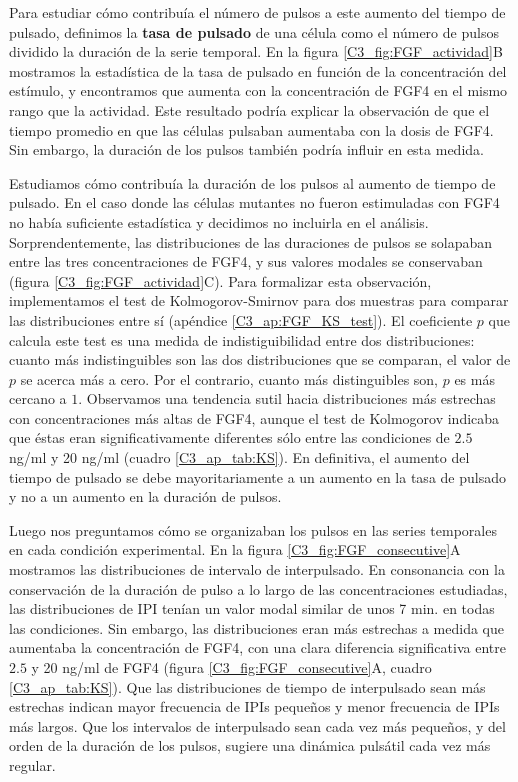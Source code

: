 \documentclass[./main.tex]{subfiles}
\begin{document}
Para estudiar cómo contribuía el número de pulsos a este aumento del tiempo de pulsado, definimos la \textbf{tasa de pulsado} de una célula como el número de pulsos dividido la duración de la serie temporal. En la figura  \ref{C3_fig:FGF_actividad}B mostramos la estadística de la tasa de pulsado en función de la concentración del estímulo, y encontramos que aumenta con la concentración de FGF4 en el mismo rango que la actividad. Este resultado podría explicar la observación de que el tiempo promedio en que las células pulsaban aumentaba con la dosis de FGF4. Sin embargo, la duración de los pulsos también podría influir en esta medida. 


Estudiamos cómo contribuía la duración de los pulsos al aumento de tiempo de pulsado. En el caso donde las células mutantes no fueron estimuladas con FGF4 no había suficiente estadística y decidimos no incluirla en el análisis. Sorprendentemente, las distribuciones de las duraciones de pulsos se solapaban entre las tres concentraciones de FGF4, y sus valores modales se conservaban (figura \ref{C3_fig:FGF_actividad}C). Para formalizar esta observación, implementamos el test de Kolmogorov-Smirnov para dos muestras para comparar las distribuciones entre sí \cite{Frodesen1979} (apéndice \ref{C3_ap:FGF_KS_test}). El coeficiente $p$ que calcula este test es una medida de indistiguibilidad entre dos distribuciones: cuanto más indistinguibles son las dos distribuciones que se comparan, el valor de $p$ se acerca más a cero. Por el contrario, cuanto más distinguibles son, $p$  es más cercano a $1$. Observamos una tendencia sutil hacia distribuciones más estrechas con concentraciones más altas de FGF4, aunque el test de Kolmogorov indicaba que éstas eran significativamente diferentes sólo entre las condiciones de $2.5$ ng/ml y 20 ng/ml (cuadro \ref{C3_ap_tab:KS}). En definitiva, el aumento del tiempo de pulsado se debe mayoritariamente a un aumento en la tasa de pulsado y no a un aumento en la duración de pulsos. 


Luego nos preguntamos cómo se organizaban los pulsos en las series temporales en cada condición experimental. En la figura \ref{C3_fig:FGF_consecutive}A mostramos las distribuciones de intervalo de interpulsado. En consonancia con la conservación de la duración de pulso a lo largo de las concentraciones estudiadas, las distribuciones de IPI tenían un valor modal similar de unos 7 min. en todas las condiciones. Sin embargo, las distribuciones eran más estrechas a medida que aumentaba la concentración de FGF4, con una clara diferencia significativa entre $2.5$ y 20 ng/ml de FGF4 (figura \ref{C3_fig:FGF_consecutive}A, cuadro \ref{C3_ap_tab:KS}). Que las distribuciones de tiempo de interpulsado sean más estrechas indican mayor frecuencia de IPIs pequeños y menor frecuencia de IPIs más largos. Que los intervalos de interpulsado sean cada vez más pequeños, y del orden de la duración de los pulsos, sugiere una dinámica pulsátil cada vez más regular.  
\end{document}
